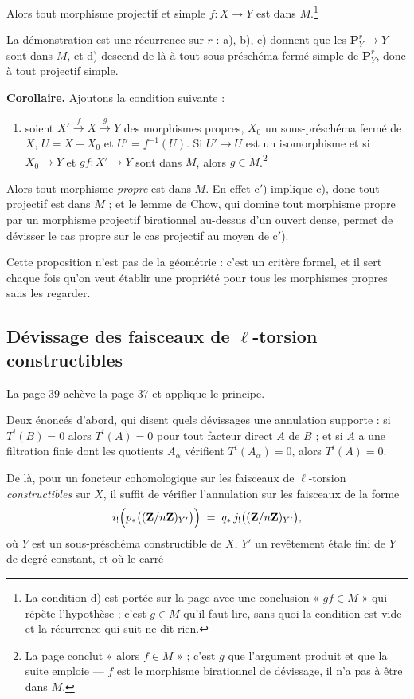 \documentclass[11pt,a4paper]{article}
\begin{document}
Alors tout morphisme projectif et simple $f : X \to Y$ est dans
$M$.\footnote{La condition d) est portée sur la page avec une conclusion
« $gf \in M$ » qui répète l'hypothèse ; c'est $g \in M$ qu'il faut lire, sans
quoi la condition est vide et la récurrence qui suit ne dit rien.}

La démonstration est une récurrence sur $r$ : a), b), c) donnent que les
$\mathbf{P}^{r}_{Y} \to Y$ sont dans $M$, et d) descend de là à tout
sous-préschéma fermé simple de $\mathbf{P}^{r}_{Y}$, donc à tout projectif
simple.

\textbf{Corollaire.} Ajoutons la condition suivante :

\begin{enumerate}
\item[c$'$)] soient $X' \xrightarrow{f} X \xrightarrow{g} Y$ des morphismes
propres, $X_{0}$ un sous-préschéma fermé de $X$, $U = X - X_{0}$ et
$U' = f^{-1}(U)$. Si $U' \to U$ est un isomorphisme et si $X_{0} \to Y$ et
$gf : X' \to Y$ sont dans $M$, alors $g \in M$.\footnote{La page conclut
« alors $f \in M$ » ; c'est $g$ que l'argument produit et que la suite emploie
— $f$ est le morphisme birationnel de dévissage, il n'a pas à être dans $M$.}
\end{enumerate}

Alors tout morphisme \emph{propre} est dans $M$. En effet c$'$) implique c),
donc tout projectif est dans $M$ ; et le lemme de Chow, qui domine tout
morphisme propre par un morphisme projectif birationnel au-dessus d'un ouvert
dense, permet de dévisser le cas propre sur le cas projectif au moyen de
c$'$).

Cette proposition n'est pas de la géométrie : c'est un critère formel, et il
sert chaque fois qu'on veut établir une propriété pour tous les morphismes
propres sans les regarder.

\subsection*{Dévissage des faisceaux de $\ell$-torsion constructibles}

La page 39 achève la page 37 et applique le principe.

Deux énoncés d'abord, qui disent quels dévissages une annulation supporte : si
$T^{i}(B) = 0$ alors $T^{i}(A) = 0$ pour tout facteur direct $A$ de $B$ ; et si
$A$ a une filtration finie dont les quotients $A_{\alpha}$ vérifient
$T^{i}(A_{\alpha}) = 0$, alors $T^{i}(A) = 0$.

De là, pour un foncteur cohomologique sur les faisceaux de $\ell$-torsion
\emph{constructibles} sur $X$, il suffit de vérifier l'annulation sur les
faisceaux de la forme
\[
  i_{!}\Bigl( p_{*}\bigl( (\mathbf{Z}/n\mathbf{Z})_{Y'} \bigr) \Bigr)
  \;=\; q_{*}\, j_{!}\bigl( (\mathbf{Z}/n\mathbf{Z})_{Y'} \bigr) ,
\]
où $Y$ est un sous-préschéma constructible de $X$, $Y'$ un revêtement étale
fini de $Y$ de degré constant, et où le carré
\end{document}
